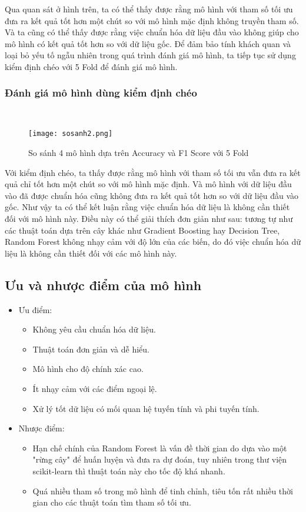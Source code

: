 \documentclass[conference]{IEEEtran}
\begin{document}
Qua quan sát ở hình trên, ta có thể thấy được rằng mô hình với tham số tối ưu đưa ra kết quả tốt hơn một chút so với mô hình mặc định không truyền tham số. Và ta cũng có thể thấy được rằng việc chuẩn hóa dữ liệu đầu vào không giúp cho mô hình có kết quả tốt hơn so với dữ liệu gốc. Để đảm bảo tính khách quan và loại bỏ yếu tố ngẫu nhiên trong quá trình đánh giá mô hình, ta tiếp tục sử dụng kiểm định chéo với 5 Fold để đánh giá mô hình.
\subsubsection{Đánh giá mô hình dùng kiểm định chéo}
\hfill\\
\begin{figure}[htbp]
\centerline{\texttt{[image: sosanh2.png]}}
\caption{So sánh 4 mô hình dựa trên Accuracy và F1 Score với 5 Fold}
\label{fig}
\end{figure}

Với kiểm định chéo, ta thấy được rằng mô hình với tham số tối ưu vẫn đưa ra kết quả chỉ tốt hơn một chút so với mô hình mặc định. Và mô hình với dữ liệu đầu vào đã được chuẩn hóa cũng không đưa ra kết quả tốt hơn so với dữ liệu đầu vào gốc. Như vậy ta có thể kết luận rằng việc chuẩn hóa dữ liệu là không cần thiết đối với mô hình này. Điều này có thể giải thích đơn giản như sau: tương tự như các thuật toán dựa trên cây khác như Gradient Boosting hay Decision Tree, Random Forest không nhạy cảm với độ lớn của các biến, do đó việc chuẩn hóa dữ liệu là không cần thiết đối với các mô hình này. 
\subsection{Ưu và nhược điểm của mô hình}
\begin{itemize}
\item Ưu điểm:
\begin{itemize}
\item Không yêu cầu chuẩn hóa dữ liệu.
\item Thuật toán đơn giản và dễ hiểu.
\item Mô hình cho độ chính xác cao.
\item Ít nhạy cảm với các điểm ngoại lệ.
\item Xử lý tốt dữ liệu có mối quan hệ tuyến tính và phi tuyến tính.
\end{itemize}
\item Nhược điểm:
\begin{itemize}
\item Hạn chế chính của Random Forest là vấn đề thời gian do dựa vào một "rừng cây" để huấn luyện và đưa ra dự đoán, tuy nhiên trong thư viện scikit-learn thì thuật toán này cho tốc độ khá nhanh.
\item Quá nhiều tham số trong mô hình để tinh chỉnh, tiêu tốn rất nhiều thời gian cho các thuật toán tìm tham số tối ưu.
\end{itemize}
\end{itemize}
\end{document}
